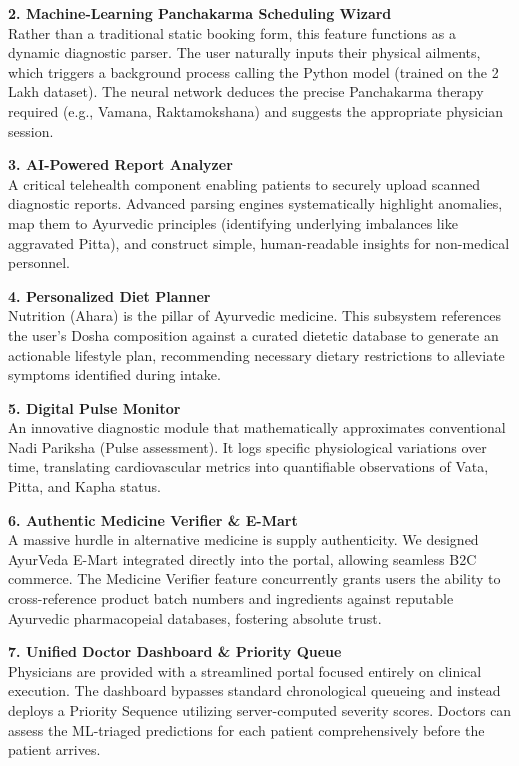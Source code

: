 \documentclass[10pt]{article}
\begin{document}
{\textbf{2. Machine-Learning Panchakarma Scheduling Wizard}\\
Rather than a traditional static booking form, this feature functions as a dynamic diagnostic parser. The user naturally inputs their physical ailments, which triggers a background process calling the Python model (trained on the 2 Lakh dataset). The neural network deduces the precise Panchakarma therapy required (e.g., Vamana, Raktamokshana) and suggests the appropriate physician session.

\textbf{3. AI-Powered Report Analyzer}\\
A critical telehealth component enabling patients to securely upload scanned diagnostic reports. Advanced parsing engines systematically highlight anomalies, map them to Ayurvedic principles (identifying underlying imbalances like aggravated Pitta), and construct simple, human-readable insights for non-medical personnel.

\textbf{4. Personalized Diet Planner}\\
Nutrition (Ahara) is the pillar of Ayurvedic medicine. This subsystem references the user's Dosha composition against a curated dietetic database to generate an actionable lifestyle plan, recommending necessary dietary restrictions to alleviate symptoms identified during intake.

\textbf{5. Digital Pulse Monitor}\\
An innovative diagnostic module that mathematically approximates conventional Nadi Pariksha (Pulse assessment). It logs specific physiological variations over time, translating cardiovascular metrics into quantifiable observations of Vata, Pitta, and Kapha status.

\textbf{6. Authentic Medicine Verifier \& E-Mart}\\
A massive hurdle in alternative medicine is supply authenticity. We designed AyurVeda E-Mart integrated directly into the portal, allowing seamless B2C commerce. The Medicine Verifier feature concurrently grants users the ability to cross-reference product batch numbers and ingredients against reputable Ayurvedic pharmacopeial databases, fostering absolute trust.

\textbf{7. Unified Doctor Dashboard \& Priority Queue}\\
Physicians are provided with a streamlined portal focused entirely on clinical execution. The dashboard bypasses standard chronological queueing and instead deploys a Priority Sequence utilizing server-computed severity scores. Doctors can assess the ML-triaged predictions for each patient comprehensively before the patient arrives.

}
\end{document}
